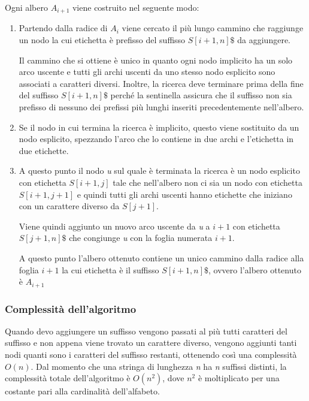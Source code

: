 Ogni albero $A_{i+1}$ viene costruito nel seguente modo:

\begin{enumerate}
	\item Partendo dalla radice di $ A_i $ viene cercato il più lungo cammino che raggiunge un nodo la cui etichetta è prefisso del suffisso $ S[i+1,n]\$ $ da aggiungere.
	
	Il cammino che si ottiene è unico in quanto ogni nodo implicito ha un solo arco uscente e tutti gli archi uscenti da uno stesso nodo esplicito sono associati a caratteri diversi.
	Inoltre, la ricerca deve terminare prima della fine del suffisso $ S[i+1,n]\$ $ perché la sentinella assicura che il suffisso non sia prefisso di nessuno dei prefissi più lunghi inseriti precedentemente nell'albero.
	
	\item Se il nodo in cui termina la ricerca è implicito, questo viene sostituito da un nodo esplicito, spezzando l'arco che lo contiene in due archi e l'etichetta in due etichette.
	
	\item A questo punto il nodo \textit{u} sul quale è terminata la ricerca è un nodo esplicito con etichetta $ S[i+1,j] $ tale che nell'albero non ci sia un nodo con etichetta $ S[i+1,j+1] $ e quindi tutti gli archi uscenti hanno etichette che iniziano con un carattere diverso da $ S[j+1] $.
	
	Viene quindi aggiunto un nuovo arco uscente da \textit{u} a $ i+1 $ con etichetta $ S[j+1,n]\$ $ che congiunge \textit{u} con la foglia numerata $ i+1 $.
	
	A questo punto l'albero ottenuto contiene un unico cammino dalla radice alla foglia $ i+1 $ la cui etichetta è il suffisso $ S[i+1,n]\$ $, ovvero l'albero ottenuto è $ A_{i+1} $
\end{enumerate}

\subsubsection{Complessità dell'algoritmo}\label{complessituxe0-dellalgoritmo}

Quando devo aggiungere un suffisso vengono passati al più tutti caratteri del suffisso e non appena viene trovato un carattere diverso, vengono aggiunti tanti nodi quanti sono i caratteri del suffisso restanti, ottenendo così una complessità $ O(n) $.
Dal momento che una stringa di lunghezza \textit{n} ha \textit{n} suffissi distinti, la complessità totale dell'algoritmo è $ O(n^2) $, dove $ n^2 $ è moltiplicato per una costante pari alla cardinalità dell'alfabeto.

